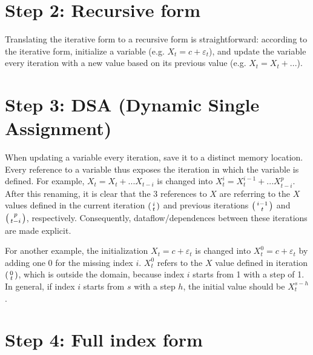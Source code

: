 \section{Step 2: Recursive form}

Translating the iterative form to a recursive form is straightforward: according to the iterative form, initialize a variable (e.g. $X_t=c+\varepsilon_t$), and update the variable every iteration with a new value based on its previous value (e.g. $X_t=X_t+...$).

\section{Step 3: DSA (Dynamic Single Assignment)}

When updating a variable every iteration, save it to a distinct memory location. Every reference to a variable thus exposes the iteration in which the variable is defined. For example, $X_t=X_t+...X_{t-i}$ is changed into  $X_t^i=X_t^{i-1}+...X_{t-i}^p$. After this renaming, it is clear that the 3 references to $X$ are referring to the $X$ values defined in the current iteration $\begin{psmallmatrix}i\\t\end{psmallmatrix}$ and previous iterations $\begin{psmallmatrix}i-1\\t\end{psmallmatrix}$ and $\begin{psmallmatrix}p\\t-i\end{psmallmatrix}$, respectively. 
Consequently, dataflow/dependences between these iterations are made explicit.  

For another example, the initialization $X_t=c+\varepsilon_t$ is changed into  $X_t^0=c+\varepsilon_t$ by adding one 0 for the missing index $i$. $X_t^0$ refers to the $X$ value defined in iteration $\begin{psmallmatrix}0\\t\end{psmallmatrix}$, which is outside the domain, because index $i$ starts from 1 with a step of 1. In general, if index $i$ starts from $s$ with a step $h$, the initial value should be $X_t^{s-h}$.

\section{Step 4: Full index form}

